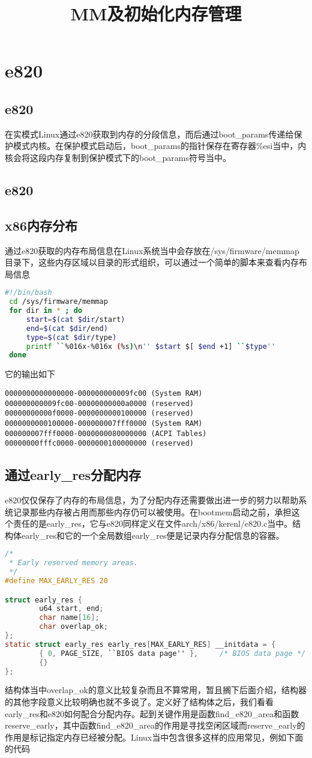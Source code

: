 \documentclass[b5paper,9pt,twoside,openany]{article}
\begin{document}
\title{MM及初始化内存管理}

\section{e820}
\subsection{e820}
在实模式Linux通过e820获取到内存的分段信息，而后通过boot\_params传递给保护模式内核。在保护模式启动后，boot\_params的指针保存在寄存器\%esi当中，内核会将这段内存复制到保护模式下的boot\_params符号当中。
\subsection{e820}
\subsection{x86内存分布}
通过e820获取的内存布局信息在Linux系统当中会存放在/sys/firmware/memmap目录下，这些内存区域以目录的形式组织，可以通过一个简单的脚本来查看内存布局信息
\begin{lstlisting}[language=bash]
#!/bin/bash
 cd /sys/firmware/memmap
 for dir in * ; do
     start=$(cat $dir/start)
     end=$(cat $dir/end)
     type=$(cat $dir/type)
     printf ``%016x-%016x (%s)\n'' $start $[ $end +1] ``$type''
 done
\end{lstlisting}
它的输出如下
\begin{lstlisting}
0000000000000000-000000000009fc00 (System RAM)
000000000009fc00-00000000000a0000 (reserved)
00000000000f0000-0000000000100000 (reserved)
0000000000100000-000000007fff0000 (System RAM)
000000007fff0000-0000000080000000 (ACPI Tables)
00000000fffc0000-0000000100000000 (reserved)
\end{lstlisting}

\subsection{通过early\_res分配内存}
e820仅仅保存了内存的布局信息，为了分配内存还需要做出进一步的努力以帮助系统记录那些内存被占用而那些内存仍可以被使用。在bootmem启动之前，承担这个责任的是early\_res，它与e820同样定义在文件arch/x86/kerenl/e820.c当中。结构体early\_res和它的一个全局数组early\_res便是记录内存分配信息的容器。
\begin{lstlisting}[language=C]
/*
 * Early reserved memory areas.
 */
#define MAX_EARLY_RES 20

struct early_res {
        u64 start, end;
        char name[16];
        char overlap_ok;
};
static struct early_res early_res[MAX_EARLY_RES] __initdata = {
        { 0, PAGE_SIZE, ``BIOS data page'' },     /* BIOS data page */
        {}
};
\end{lstlisting}
结构体当中overlap\_ok的意义比较复杂而且不算常用，暂且搁下后面介绍，结构器的其他字段意义比较明确也就不多说了。定义好了结构体之后，我们看看early\_res和e820如何配合分配内存。起到关键作用是函数find\_e820\_area和函数reserve\_early，其中函数find\_e820\_area的作用是寻找空闲区域而reserve\_early的作用是标记指定内存已经被分配。Linux当中包含很多这样的应用常见，例如下面的代码
\end{document}
